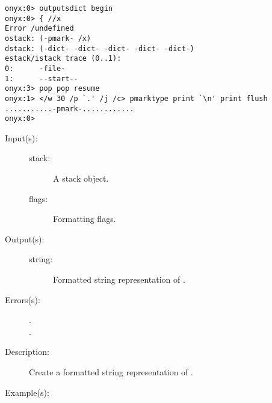 \begin{description}
\begin{description}
\begin{verbatim}
onyx:0> outputsdict begin
onyx:0> { //x
Error /undefined
ostack: (-pmark- /x)
dstack: (-dict- -dict- -dict- -dict- -dict-)
estack/istack trace (0..1):
0:      -file-
1:      --start--
onyx:3> pop pop resume
onyx:1> </w 30 /p `.' /j /c> pmarktype print `\n' print flush
...........-pmark-............
onyx:0>
		\end{verbatim}
	\end{description}
\label{outputsdict:stacktype}
\item[{\onyxop{stack flags}{stacktype}{string}}: ]
	\begin{description}\item[]
	\item[Input(s): ]
		\begin{description}\item[]
		\item[stack: ]
			A stack object.
		\item[flags: ]
			Formatting flags.
		\end{description}
	\item[Output(s): ]
		\begin{description}\item[]
		\item[string: ]
			Formatted string representation of .
		\end{description}
	\item[Errors(s): ]
		\begin{description}\item[]
		\item[.]
		\item[.]
		\end{description}
	\item[Description: ]
		Create a formatted string representation of .
	\item[Example(s): ]\begin{verbatim}


\end{verbatim}
\end{description}
\end{description}
